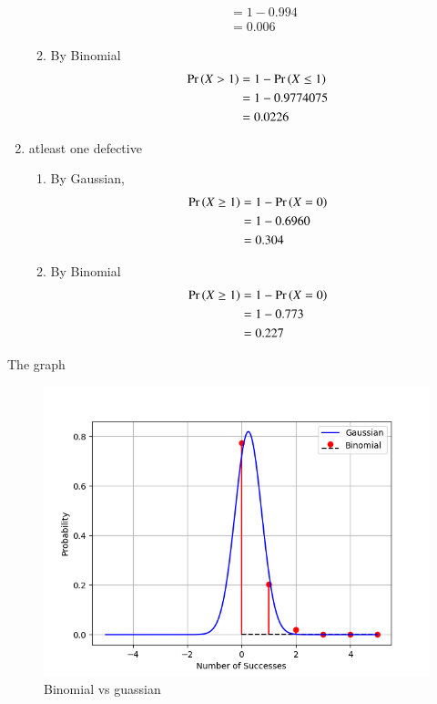 \documentclass[article]{IEEEtran}
\theoremstyle{remark}
\begin{document}
\begin{enumerate}
\begin{enumerate}
\begin{align}
			&= 1 - 0.994\\
			&= 0.006
		\end{align}
		\item By Binomial
		\begin{align}
			\Pr\left(X>1\right) &= 1 - \Pr\left(X \leq 1\right)\\
			&= 1 - 0.9774075\\
			&= 0.0226
		\end{align}	
	\end{enumerate}
	\item atleast one defective\\
	\begin{enumerate}
		\item By Gaussian,\\
		\begin{align}
			\Pr\left(X \geq 1\right) &= 1 -\Pr\left(X = 0\right)\\
			&= 1 - 0.6960\\
			&= 0.304
		\end{align}
		\item By Binomial
		\begin{align}
			\Pr\left(X \geq 1\right) &= 1 -\Pr\left(X = 0\right)\\
			&= 1 - 0.773\\
			&= 0.227
		\end{align}	
	\end{enumerate}
\end{enumerate}
The graph\\
\begin{figure}[H]
\includegraphics[width=\columnwidth]{./figs/bg.png}
\caption{Binomial vs guassian}
\label{fig:BvG_py}
\end{figure}
\end{document}
